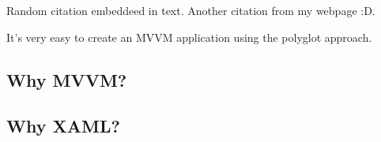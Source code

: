     Random citation \cite{DUMMY:1} embeddeed in text.
    Another citation \cite{kexugit} from my webpage :D.
    
    It’s very easy to create an MVVM application using the polyglot approach.

\subsection{Why MVVM?}

\subsection{Why XAML?}

